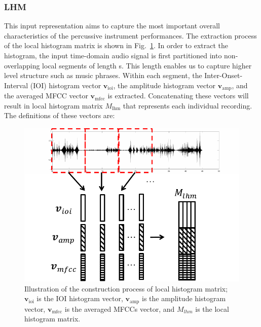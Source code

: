 \documentclass[conference]{IEEEtran}
\begin{document}
\subsubsection{LHM}
This input representation aims to capture the most important overall characteristics of the percussive instrument performances. The extraction process of the local histogram matrix is shown in Fig.~\ref{fig:hist_mat}. In order to extract the histogram, the input time-domain audio signal is first partitioned into non-overlapping local segments of length \unit[10]{s}. This length enables us to capture higher level structure such as music phrases. Within each segment, the Inter-Onset-Interval (IOI) histogram vector $\mathbf{v}_\mathrm{ioi}$, the amplitude histogram vector $\mathbf{v}_\mathrm{amp}$, and the averaged MFCC vector $\mathbf{v}_\mathrm{mfcc}$ is extracted.
Concatenating these vectors will result in local histogram matrix $M_\mathrm{lhm}$ that represents each individual recording. The definitions of these vectors are:
\begin{figure}
    \centering
    \includegraphics[width = 8 cm]{./figs/hist_mat.pdf}
    \caption{Illustration of the construction process of local histogram matrix; $\mathbf{v}_\mathrm{ioi}$ is the IOI histogram vector, $\mathbf{v}_\mathrm{amp}$ is the amplitude histogram vector, $\mathbf{v}_\mathrm{mfcc}$ is the averaged MFCCs vector, and $M_{lhm}$ is the local histogram matrix.}
    \label{fig:hist_mat}
\end{figure}
\end{document}
